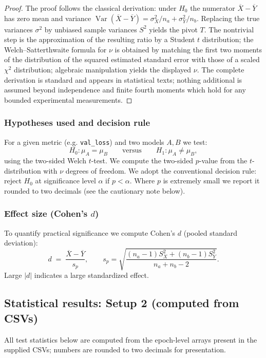 \documentclass[11pt, twoside, openright, english]{article}
\numberwithin{equation}{section}
\theoremstyle{plain}
\theoremstyle{definition}
\theoremstyle{remark}
\begin{document}
\begin{proof}
The proof follows the classical derivation: under $H_0$ the numerator $\overline X-\overline Y$ has zero mean and variance $\operatorname{Var}(\overline X-\overline Y)=\sigma_X^2/n_a + \sigma_Y^2/n_b$. Replacing the true variances $\sigma^2$ by unbiased sample variances $S^2$ yields the pivot $T$. The nontrivial step is the approximation of the resulting ratio by a Student $t$ distribution; the Welch--Satterthwaite formula for $\nu$ is obtained by matching the first two moments of the distribution of the squared estimated standard error with those of a scaled $\chi^2$ distribution; algebraic manipulation yields the displayed $\nu$. The complete derivation is standard and appears in statistical texts; nothing additional is assumed beyond independence and finite fourth moments which hold for any bounded experimental measurements.
\end{proof}

\subsubsection{Hypotheses used and decision rule}
For a given metric (e.g. \texttt{val\_loss}) and two models $A,B$ we test:
\[
H_0:\mu_A=\mu_B\qquad\text{versus}\qquad H_1:\mu_A\ne\mu_B,
\]
using the two-sided Welch $t$-test. We compute the two-sided $p$-value from the $t$-distribution with $\nu$ degrees of freedom. We adopt the conventional decision rule: reject $H_0$ at significance level $\alpha$ if $p<\alpha$. Where $p$ is extremely small we report it rounded to two decimals (see the cautionary note below).

\subsubsection{Effect size (Cohen's $d$)}
To quantify practical significance we compute Cohen's $d$ (pooled standard deviation):
\[
d \;=\; \frac{\overline X - \overline Y}{s_p},\qquad s_p = \sqrt{\frac{(n_a-1)S_X^2 + (n_b-1)S_Y^2}{n_a+n_b-2}}.
\]
Large $|d|$ indicates a large standardized effect.

\subsection{Statistical results: Setup 2 (computed from CSVs)}
All test statistics below are computed from the epoch-level arrays present in the supplied CSVs; numbers are rounded to two decimals for presentation.
\end{document}
